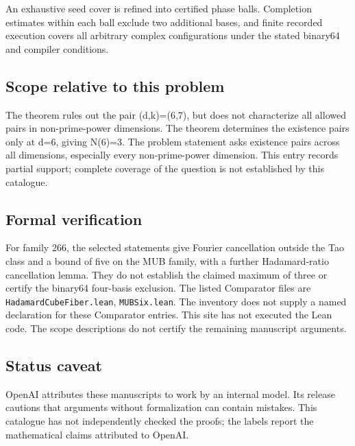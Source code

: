 \documentclass[11pt]{article}
\begin{document}
An exhaustive seed cover is refined into certified phase balls. Completion estimates within each ball exclude two additional bases, and finite recorded execution covers all arbitrary complex configurations under the stated binary64 and compiler conditions.

\subsection{Scope relative to this problem}
The theorem rules out the pair (d,k)=(6,7), but does not characterize all allowed pairs in non-prime-power dimensions. The theorem determines the existence pairs only at d=6, giving N(6)=3. The problem statement asks existence pairs across all dimensions, especially every non-prime-power dimension. This entry records partial support; complete coverage of the question is not established by this catalogue.

\subsection{Formal verification}
For family 266, the selected statements give Fourier cancellation outside the Tao class and a bound of five on the MUB family, with a further Hadamard-ratio cancellation lemma. They do not establish the claimed maximum of three or certify the binary64 four-basis exclusion. The listed Comparator files are \texttt{HadamardCubeFiber.lean}, \texttt{MUBSix.lean}. The inventory does not supply a named declaration for these Comparator entries. This site has not executed the Lean code. The scope descriptions do not certify the remaining manuscript arguments.

\subsection{Status caveat}
OpenAI attributes these manuscripts to work by an internal model. Its release cautions that arguments without formalization can contain mistakes. This catalogue has not independently checked the proofs; the labels report the mathematical claims attributed to OpenAI.
\end{document}
